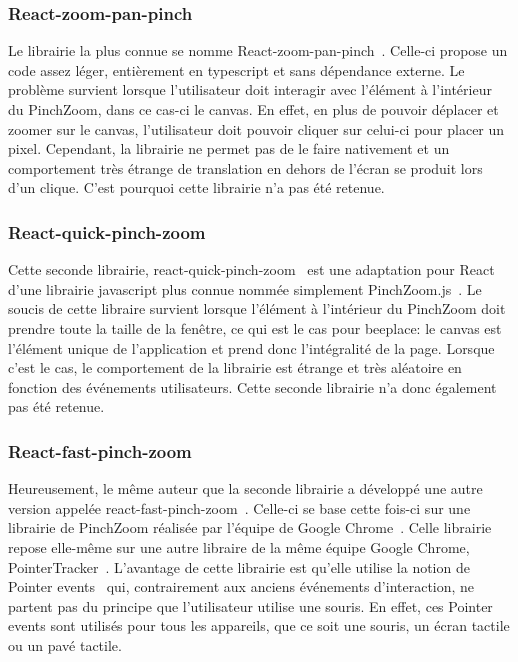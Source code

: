 \subsubsection{React-zoom-pan-pinch}

Le librairie la plus connue se nomme React-zoom-pan-pinch~\cite{react-zoom-pan-pinch}. Celle-ci propose un code assez léger, entièrement en \gls{typescript} et sans dépendance externe. Le problème survient lorsque l'utilisateur doit interagir avec l'élément à l'intérieur du PinchZoom, dans ce cas-ci le canvas. En effet, en plus de pouvoir déplacer et zoomer sur le canvas, l'utilisateur doit pouvoir cliquer sur celui-ci pour placer un pixel. Cependant, la librairie ne permet pas de le faire nativement et un comportement très étrange de translation en dehors de l'écran se produit lors d'un clique. C'est pourquoi cette librairie n'a pas été retenue.

\subsubsection{React-quick-pinch-zoom}

Cette seconde librairie, react-quick-pinch-zoom~\cite{react-quick-pinch-zoom} est une adaptation pour React d'une librairie \gls{javascript} plus connue nommée simplement PinchZoom.js~\cite{pinchzoomjs}. Le soucis de cette libraire survient lorsque l'élément à l'intérieur du PinchZoom doit prendre toute la taille de la fenêtre, ce qui est le cas pour \gls{beeplace}: le canvas est l'élément unique de l'application et prend donc l'intégralité de la page. Lorsque c'est le cas, le comportement de la librairie est étrange et très aléatoire en fonction des événements utilisateurs. Cette seconde librairie n'a donc également pas été retenue.

\subsubsection{React-fast-pinch-zoom}

Heureusement, le même auteur que la seconde librairie a développé une autre version appelée react-fast-pinch-zoom~\cite{react-fast-pinch-zoom}. Celle-ci se base cette fois-ci sur une librairie de PinchZoom réalisée par l'équipe de Google Chrome~\cite{pinch-zoom-googlechromelabs}. Celle librairie repose elle-même sur une autre libraire de la même équipe Google Chrome, PointerTracker~\cite{pointer-tracker}. L'avantage de cette librairie est qu'elle utilise la notion de Pointer events~\cite{pointer-events} qui, contrairement aux anciens événements d'interaction, ne partent pas du principe que l'utilisateur utilise une souris. En effet, ces Pointer events sont utilisés pour tous les appareils, que ce soit une souris, un écran tactile ou un pavé tactile.


